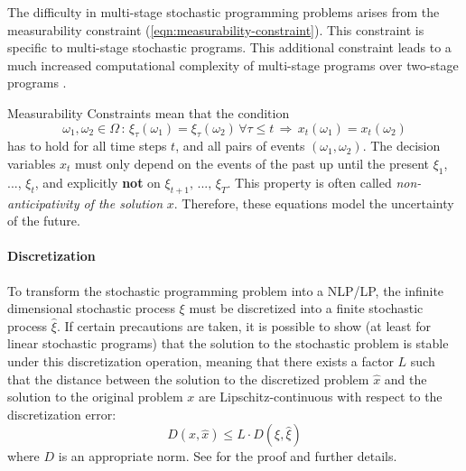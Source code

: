 \documentclass[a4paper, 12pt] {article}
\begin{document}
The difficulty in multi-stage stochastic programming problems arises from the measurability constraint (\ref{eqn:measurability-constraint}). This constraint is specific to multi-stage stochastic programs.
This additional constraint leads to a much increased computational complexity of multi-stage programs over two-stage programs \cite{Shapiro2005,Shapiro2008}.
% 
\par{Measurability Constraints} 
mean that the condition
\begin{equation}
  \label{eq:mathematical-NAC}
  \omega_1,\omega_2\in \Omega \, : \, \xi_\tau(\omega_1) = \xi_\tau(\omega_2)\,\forall \tau\leq t\,\Rightarrow \, x_t(\omega_1) = x_t(\omega_2) 
\end{equation}
has to hold for all time steps $t$, and all pairs of events $(\omega_1,\omega_2)$. 
The decision variables $x_t$ must only depend on the events of the past up until the present $\xi_1$, ..., $\xi_t$, and explicitly \textbf{not} on $\xi_{t+1},\, ...,\,\xi_T$. 
This property is often called \textit{non-anticipativity of the solution} $x$. 
Therefore, these equations model the uncertainty of the future.
% 
\paragraph{Discretization}
% 
To transform the stochastic programming problem into a NLP/LP, the infinite dimensional stochastic process $\xi$ must be discretized into a finite stochastic process $\hat{\xi}$. If certain precautions are taken, it is possible to show (at least for linear stochastic programs) that the solution to the stochastic problem is stable under this discretization operation, meaning that there exists a factor $L$ such that the distance between the solution to the discretized problem $\hat{x}$ and the solution to the original problem $x$ are Lipschitz-continuous with respect to the discretization error:
\begin{equation}
  D(x , \hat{x}) \leq L\cdot D(\xi,\hat{\xi})
\end{equation}
where $D$ is an appropriate norm. See \cite{Heitsch2009} for the proof and further details.
\end{document}

